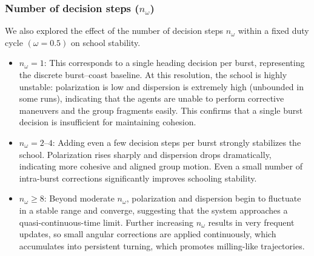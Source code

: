 \subsubsection{Number of decision steps ($n_\omega$)}

We also explored the effect of the number of decision steps $n_\omega$ within a fixed duty cycle $(\omega = 0.5)$ on school stability.


\begin{itemize}[itemsep=-1mm]
    \item $n_\omega = 1$: This corresponds to a single heading decision per burst, representing the discrete burst–coast baseline. At this resolution, the school is highly unstable: polarization is low and dispersion is extremely high (unbounded in some runs), indicating that the agents are unable to perform corrective maneuvers and the group fragments easily. This confirms that a single burst decision is insufficient for maintaining cohesion.
    
    \item $n_\omega = 2$--$4$: Adding even a few decision steps per burst strongly stabilizes the school. Polarization rises sharply and dispersion drops dramatically, indicating more cohesive and aligned group motion. Even a small number of intra-burst corrections significantly improves schooling stability.
    
    \item $n_\omega \geq 8$: Beyond moderate $n_\omega$, polarization and dispersion begin to fluctuate in a stable range and converge, suggesting that the system approaches a quasi-continuous-time limit. Further increasing $n_\omega$ results in very frequent updates, so small angular corrections are applied continuously, which accumulates into persistent turning, which promotes milling-like trajectories. 
\end{itemize}

